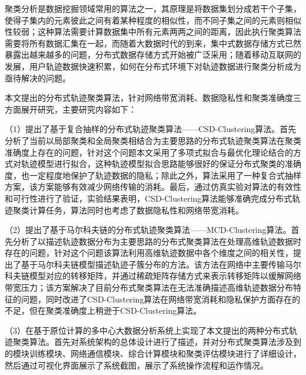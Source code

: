 	
\begin{chineseabstract}
聚类分析是数据挖掘领域常用的算法之一，其原理是将数据集划分成若干个子集，使得子集内的元素彼此之间有着某种程度的相似性，而不同子集之间的元素则相似性较弱；这种算法需要计算数据集中所有元素两两之间的距离，因此执行聚类算法需要将所有数据汇集在一起，而随着大数据时代的到来，集中式数据存储方式已然暴露出越来越多的问题，分布式数据存储方式开始被广泛采用；随着移动互联网的发展，用户轨迹数据快速积累，如何在分布式环境下对轨迹数据进行聚类分析成为亟待解决的问题。

本文提出的分布式轨迹聚类算法，针对网络带宽消耗、数据隐私性和聚类准确度三方面展开研究，主要研究内容如下：

（1）提出了基于复合抽样的分布式轨迹聚类算法——CSD-Clustering算法。首先分析了当前以局部聚类和全局聚类相结合为主要思路的分布式轨迹聚类算法在聚类准确度上存在的问题，针对这个问题本文采用了多项式拟合与最优化理论结合的方式对轨迹模型进行拟合，这种轨迹模型拟合思路能够很好的保证分布式聚类的准确度，也一定程度地保护了轨迹数据的隐私；除此之外，算法采用了一种复合式抽样方案，该方案能够有效减少网络传输的消耗。最后，通过仿真实验对算法的有效性和可行性进行了验证，实验结果表明，CSD-Clustering算法能够准确完成分布式轨迹聚类计算任务，算法同时也考虑了数据隐私性和网络带宽消耗。

（2）提出了基于马尔科夫链的分布式轨迹聚类算法——MCD-Clustering算法。首先分析了以描述轨迹数据分布为主要思路的分布式聚类算法在处理高维轨迹数据时存在的问题，针对这个问题该算法利用高维轨迹数据中各个维度之间的相关性，提出了基于马尔科夫链模型描述轨迹子簇分布的方法。该方法在网络中主要传输马尔科夫链模型对应的转移矩阵，并通过稀疏矩阵存储方式来表示转移矩阵以缓解网络带宽压力；该方案解决了目前分布式聚类算法在无法准确描述高维轨迹数据分布特征的问题，同时改进了CSD-Clustering算法在网络带宽消耗和隐私保护方面存在的不足，但在聚类准确度上稍逊于CSD-Clustering算法。

（3）在基于原位计算的多中心大数据分析系统上实现了本文提出的两种分布式轨迹聚类算法。首先对系统架构的总体设计进行了描述，并对分布式聚类算法涉及到的模块训练模块、网络通信模块、综合计算模块和聚类评估模块进行了详细设计，然后通过可视化界面展示了系统截图，展示了系统操作流程和运作情况。

\end{chineseabstract}